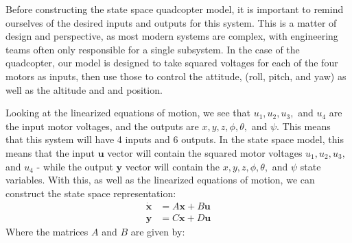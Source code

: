\documentclass[12pt]{article}
\begin{document}
Before constructing the state space quadcopter model, it is important to remind ourselves 
of the desired inputs and outputs for this system. This is a matter of design and perspective,
as most modern systems are complex, with engineering teams often only responsible
for a single subsystem. In the case of the quadcopter, our model is designed to take squared
voltages for each of the four motors as inputs, then use those to control the attitude, 
(roll, pitch, and yaw) as well as the altitude and and position. 
\par
Looking at the linearized equations of motion, we see that $u_1, u_2, u_3,$ and $u_4$ are the 
input motor voltages, and the outputs are $x,y,z,\phi,\theta,$ and $\psi$. This means that this 
system will have 4 inputs and 6 outputs. In the state space model, this means that the input $\textbf{u}$
vector will contain the squared motor voltages $u_1, u_2, u_3,$ and $u_4$ - while the output $\textbf{y}$ vector 
will contain the $x,y,z,\phi,\theta,$ and $\psi$ state variables. With this, as well as the 
linearized equations of motion, we can construct the state space representation:
\begin{align*}
  \dot{\textbf{x}} &= A\textbf{x} + B\textbf{u} \\
  \textbf{y} &= C\textbf{x} + D\textbf{u} 
\end{align*}
Where the matrices $A$ and $B$ are given by:
\end{document}
